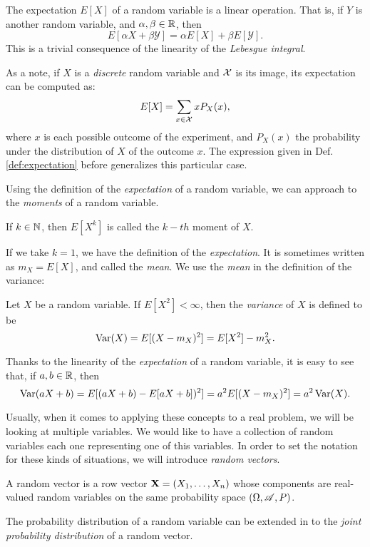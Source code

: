 The expectation $E[X]$ of a random variable is a linear operation. That is, if $Y$ is another random variable, and $\alpha,\beta \in \mathbb{R}$, then
$$
E[\alpha X + \beta \mathcal Y] = \alpha E[X] + \beta E[\mathcal Y].
$$
This is a trivial consequence of the linearity of the \emph{Lebesgue integral}.

As a note, if $X$ is a \emph{discrete} random variable and $\mathcal{X}$ is its image, its expectation can be computed as:
$$
E[X] = \sum_{x \in \mathcal{X}} x  P_X(x),
$$
where $x$ is each possible outcome of the experiment, and $P_X(x)$ the probability under the distribution of $X$ of the outcome $x$. 
The expression given in Def. \cref{def:expectation} before generalizes this particular case.

Using the definition of the \emph{expectation} of a random variable, we can approach to the \emph{moments} of a random variable.

\begin{ndef}
If $k \in \mathbb N$, then $E[X^k]$ is called the $k-th$ moment of $X$.
\end{ndef}
If we take $k = 1$, we have the definition of the \emph{expectation}. It is sometimes written as $m_X = E[X]$, and called the \emph{mean}. We use the \emph{mean} in the definition of the variance:

\begin{ndef}
Let $X$ be a random variable. If $E[X^2] < \infty$, then the \emph{variance} of $X$ is defined to be
$$
\operatorname*{Var}(X) = E[(X - m_X)^2] = E[X^2] - m_X^2.
$$
\end{ndef}

Thanks to the linearity of the \emph{expectation} of a random variable, it is easy to see that, if $a,b \in \mathbb{R}$, then
$$
\operatorname*{Var}(aX + b) = E[(aX + b) - E[aX + b])^2] = a^2E[(X - m_X)^2] = a^2 \operatorname*{Var}(X).
$$



Usually, when it comes to applying these concepts to a real problem, we will be looking at multiple variables. We would like to have a collection of random variables each one representing one of this variables.
In order to set the notation for these kinds of situations, we will introduce \emph{random vectors}.

\begin{ndef}
  A random vector is a row vector $\mathbf{X} = (X_1,\dots,X_n)$ whose components are real-valued random variables on the same probability space $(\Omega,\mathscr{A},P)$.
\end{ndef}

The probability distribution of a random variable can be extended in to the \emph{joint probability distribution} of a random vector.

